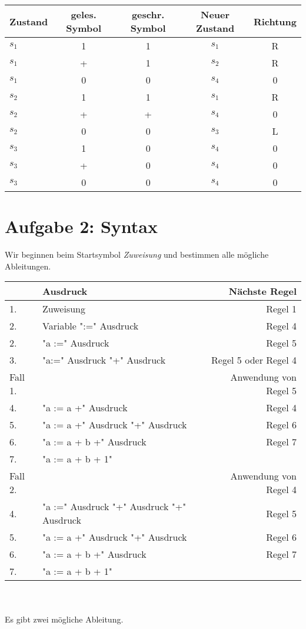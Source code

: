 \documentclass[11pt]{article} %
\begin{document}
\begin{tabular}{l|c|c|c|c}
Zustand&geles. Symbol&geschr. Symbol&Neuer Zustand&Richtung\\\hline
$s_1$&1&1&$s_1$&R\\
$s_1$&+&1&$s_2$&R\\
$s_1$&0&0&$s_4$&0\\
$s_2$&1&1&$s_1$&R\\
$s_2$&+&+&$s_4$&0\\
$s_2$&0&0&$s_3$&L\\
$s_3$&1&0&$s_4$&0\\
$s_3$&+&0&$s_4$&0\\
$s_3$&0&0&$s_4$&0\\
\end{tabular}

\newpage

\section{Aufgabe 2: Syntax}

Wir beginnen beim Startsymbol \textit{Zuweisung} und bestimmen alle mögliche Ableitungen. \\

\begin{large}
\begin{tabular}{|l|l|r|}
\hline
&Ausdruck&Nächste Regel \\\hline
1.&Zuweisung&Regel 1\\
2.&Variable ":=" Ausdruck&Regel 4\\
2.&"a :=" Ausdruck&Regel 5\\
3.&"a:=" Ausdruck "+" Ausdruck&Regel 5 oder Regel 4\\\hline

Fall 1.&&Anwendung von Regel 5\\
4.&"a := a +" Ausdruck&Regel 4\\
5.&"a := a +" Ausdruck "+" Ausdruck&Regel 6\\
6.&"a := a + b +" Ausdruck&Regel 7\\
7.&"a := a + b + 1"&\\\hline

Fall 2.&&Anwendung von Regel 4\\
4.&"a :=" Ausdruck "+" Ausdruck "+" Ausdruck&Regel 5\\
5.&"a := a +" Ausdruck "+" Ausdruck&Regel 6\\
6.&"a := a + b +" Ausdruck&Regel 7\\
7.&"a := a + b + 1"&\\\hline
\end{tabular}
\end{large}
\\\\
Es gibt zwei mögliche Ableitung. \\
\end{document}
